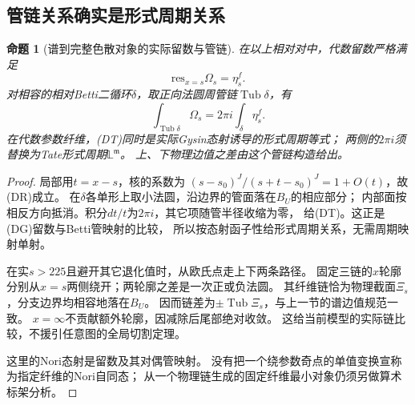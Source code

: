 \documentclass[11pt,a4paper]{ctexart}
\theoremstyle{cnplain}\newtheorem{theorem}{定理}[section]
\newtheorem{proposition}[theorem]{命题}
\theoremstyle{definition}\newtheorem{definition}[theorem]{定义}
\theoremstyle{remark}\newtheorem{remark}[theorem]{注}
\begin{document}
\subsection{管链关系确实是形式周期关系}
\begin{proposition}[谱到完整色散对象的实际留数与管链]\label{prop:dispersiontube}
在以上相对对中，代数留数严格满足
\[
 \mathrm{res}_{x=s}\Omega_s=\eta_s^f .
 \tag{DR}\label{eq:dispersionresidue}
\]
对相容的相对Betti二循环$\delta$，取正向法圆周管链$\operatorname{Tub}\delta$，有
\[
 \int_{\operatorname{Tub}\delta}\Omega_s
       =2\pi i\int_\delta\eta_s^f .
 \tag{DT}\label{eq:dispersiontube}
\]
在代数参数纤维，(DT)同时是实际Gysin态射诱导的形式周期等式；
两侧的$2\pi i$须替换为Tate形式周期$\mathbb L^{\mathfrak m}$。
上、下物理边值之差由这个管链构造给出。
\end{proposition}
\begin{proof}
局部用$t=x-s$，核的系数为
$(s-s_0)^J/(s+t-s_0)^J=1+O(t)$，故(DR)成立。
在$\delta$各单形上取小法圆，沿边界的管面落在$B_U$的相应部分；
内部面按相反方向抵消。积分$dt/t$为$2\pi i$，其它项随管半径收缩为零，
给(DT)。这正是(DG)留数与Betti管映射的比较，
所以按态射函子性给形式周期关系，无需周期映射单射。

在实$s>225$且避开其它退化值时，从欧氏点走上下两条路径。
固定三链的$x$轮廓分别从$x=s$两侧绕开；两轮廓之差是一次正或负法圆。
其纤维链恰为物理截面$\Xi_s$，分支边界均相容地落在$B_U$。
因而链差为$\pm\operatorname{Tub}\Xi_s$，与上一节的谱边值规范一致。
$x=\infty$不贡献额外轮廓，因减除后尾部绝对收敛。
这给当前模型的实际链比较，不援引任意图的全局切割定理。

这里的Nori态射是留数及其对偶管映射。
没有把一个绕参数奇点的单值变换宣称为指定纤维的Nori自同态；
从一个物理链生成的固定纤维最小对象仍须另做算术标架分析。
\end{proof}
\end{document}
